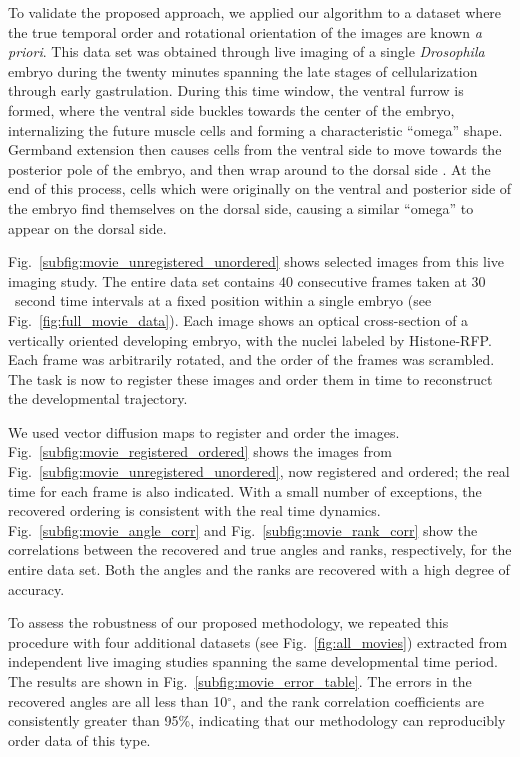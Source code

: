 \documentclass{pnastwo}
\newcommand{\fig}[0]{Fig.}
\begin{document}
\begin{article}
To validate the proposed approach, we applied our algorithm to a dataset where the true temporal order and rotational orientation of the images are known {\em a priori}.
%
This data set was obtained through live imaging of a single {\it Drosophila} embryo during the twenty minutes spanning the late stages of cellularization through early gastrulation.
%
During this time window, the ventral furrow is formed, where the ventral side buckles towards the center of the embryo, internalizing the future muscle cells and forming a characteristic ``omega'' shape.
%
Germband extension then causes cells from the ventral side to move towards the posterior pole of the embryo, and then wrap around to the dorsal side \cite{leptin2005gastrulation}.
%
At the end of this process, cells which were originally on the ventral and posterior side of the embryo find themselves on the dorsal side, causing a similar ``omega'' to appear on the dorsal side.

\fig~\ref{subfig:movie_unregistered_unordered} shows selected images from this live imaging study. 
%
The entire data set contains $40$ consecutive frames taken at $30$~second time intervals at a fixed position within a single embryo (see \fig~\ref{fig:full_movie_data}).
%
Each image shows an optical cross-section of a vertically oriented developing embryo, with the nuclei labeled by Histone-RFP.
%
Each frame was arbitrarily rotated, and the order of the frames was scrambled.
%
The task is now to register these images and order them in time to reconstruct the developmental trajectory.

We used vector diffusion maps to register and order the images. 
%
\fig~\ref{subfig:movie_registered_ordered} shows the images from \fig~\ref{subfig:movie_unregistered_unordered}, now registered and ordered; the real time for each frame is also indicated.
%
With a small number of exceptions, the recovered ordering is consistent with the real time dynamics. 
%
\fig~\ref{subfig:movie_angle_corr} and \fig~\ref{subfig:movie_rank_corr}  show the correlations between the recovered and true angles and ranks, respectively, for the entire data set. 
%
Both the angles and the ranks are recovered with a high degree of accuracy.

To assess the robustness of our proposed methodology, we repeated this procedure with four additional datasets (see \fig~\ref{fig:all_movies}) extracted from independent live imaging studies spanning the same developmental time period. 
%
The results are shown in \fig~\ref{subfig:movie_error_table}. 
%
The errors in the recovered angles are all less than 10$^\circ$, and the rank correlation coefficients are consistently greater than 95\%, indicating that our methodology can reproducibly order data of this type. 


\end{article}
\end{document}
